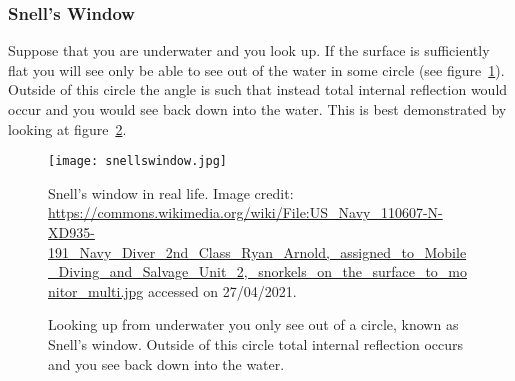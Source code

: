    \subsubsection{Snell's Window}
    Suppose that you are underwater and you look up.
    If the surface is sufficiently flat you will see only be able to see out of the water in some circle (see figure~\ref{fig:snell's window irl}).
    Outside of this circle the angle is such that instead total internal reflection would occur and you would see back down into the water.
    This is best demonstrated by looking at figure~\ref{fig:snell's window}.
    \begin{figure}[htbp!]
        \centering
        \texttt{[image: snellswindow.jpg]}
        \caption{Snell's window in real life. Image credit: \url{https://commons.wikimedia.org/wiki/File:US_Navy_110607-N-XD935-191_Navy_Diver_2nd_Class_Ryan_Arnold,_assigned_to_Mobile_Diving_and_Salvage_Unit_2,_snorkels_on_the_surface_to_monitor_multi.jpg} accessed on 27/04/2021.}
        \label{fig:snell's window irl}
    \end{figure}
    \begin{figure}[htbp!]
        \centering
        \caption{Looking up from underwater you only see out of a circle, known as Snell's window. Outside of this circle total internal reflection occurs and you see back down into the water.}
        \label{fig:snell's window}
    \end{figure}
    

